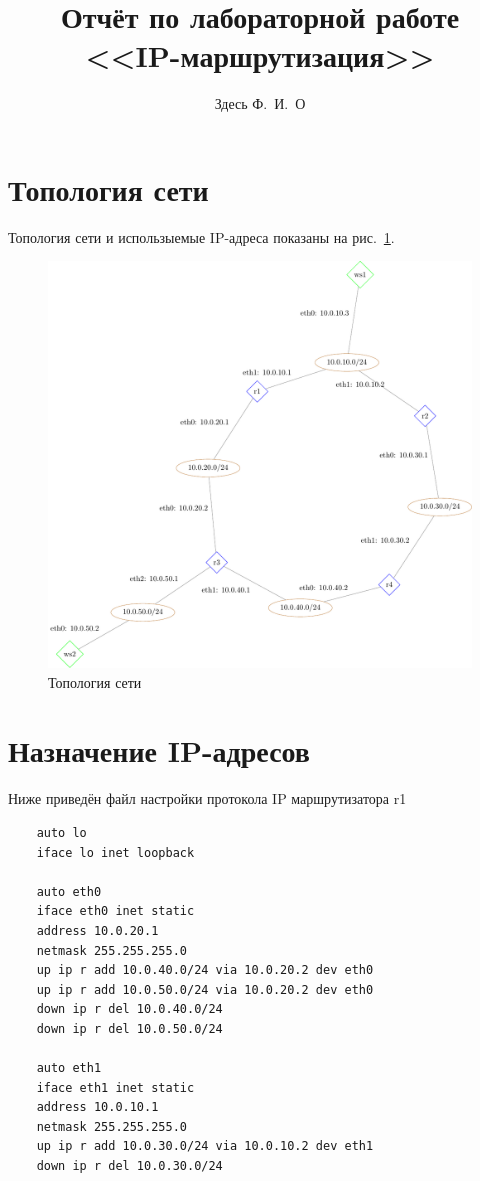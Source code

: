\documentclass[a4paper,12pt]{article}
\title{Отчёт по лабораторной работе \\ <<IP-маршрутизация>>}
\author{Здесь Ф.~И.~О}
\begin{document}
\maketitle

\tableofcontents


\section{Топология сети}

Топология сети и использыемые IP-адреса показаны на рис.~\ref{fig:network}.

\begin{figure}
\centering
\includegraphics[width=\textwidth]{includes/network_gv.pdf}
\caption{Топология сети}
\label{fig:network}
\end{figure}


\section{Назначение IP-адресов}

Ниже приведён файл настройки протокола IP маршрутизатора r1

\begin{Verbatim}
    auto lo
    iface lo inet loopback
    
    auto eth0
    iface eth0 inet static
    address 10.0.20.1
    netmask 255.255.255.0
    up ip r add 10.0.40.0/24 via 10.0.20.2 dev eth0
    up ip r add 10.0.50.0/24 via 10.0.20.2 dev eth0
    down ip r del 10.0.40.0/24
    down ip r del 10.0.50.0/24
    
    auto eth1
    iface eth1 inet static
    address 10.0.10.1
    netmask 255.255.255.0
    up ip r add 10.0.30.0/24 via 10.0.10.2 dev eth1
    down ip r del 10.0.30.0/24
\end{Verbatim}
\end{document}
